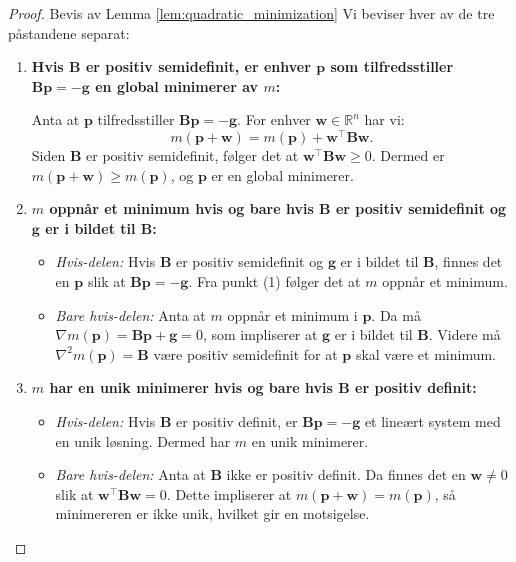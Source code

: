 \begin{proof}{Bevis av Lemma \ref{lem:quadratic_minimization}}
	Vi beviser hver av de tre påstandene separat:

	\begin{enumerate}
		\item \textbf{Hvis \(\symbf{B}\) er positiv semidefinit, er enhver \(\symbf{p}\) som tilfredsstiller \(\symbf{B}\symbf{p} = -\symbf{g}\) en global minimerer av \(m\):}

		      Anta at \(\symbf{p}\) tilfredsstiller \(\symbf{B}\symbf{p} = -\symbf{g}\). For enhver \(\symbf{w} \in \mathbb{R}^n\) har vi:
		      \[
			      m(\symbf{p} + \symbf{w}) = m(\symbf{p}) + \symbf{w}^\top \symbf{B} \symbf{w}.
		      \]
		      Siden \(\symbf{B}\) er positiv semidefinit, følger det at \(\symbf{w}^\top \symbf{B} \symbf{w} \geq 0\). Dermed er \(m(\symbf{p} + \symbf{w}) \geq m(\symbf{p})\), og \(\symbf{p}\) er en global minimerer.

		\item \textbf{\(m\) oppnår et minimum hvis og bare hvis \(\symbf{B}\) er positiv semidefinit og \(\symbf{g}\) er i bildet til \(\symbf{B}\):}

		      \begin{itemize}
			      \item \textit{Hvis-delen:} Hvis \(\symbf{B}\) er positiv semidefinit og \(\symbf{g}\) er i bildet til \(\symbf{B}\), finnes det en \(\symbf{p}\) slik at \(\symbf{B}\symbf{p} = -\symbf{g}\). Fra punkt (1) følger det at \(m\) oppnår et minimum.
			      \item \textit{Bare hvis-delen:} Anta at \(m\) oppnår et minimum i \(\symbf{p}\). Da må \(\nabla m(\symbf{p}) = \symbf{B}\symbf{p} + \symbf{g} = 0\), som impliserer at \(\symbf{g}\) er i bildet til \(\symbf{B}\). Videre må \(\nabla^2 m(\symbf{p}) = \symbf{B}\) være positiv semidefinit for at \(\symbf{p}\) skal være et minimum.
		      \end{itemize}

		\item \textbf{\(m\) har en unik minimerer hvis og bare hvis \(\symbf{B}\) er positiv definit:}

		      \begin{itemize}
			      \item \textit{Hvis-delen:} Hvis \(\symbf{B}\) er positiv definit, er \(\symbf{B}\symbf{p} = -\symbf{g}\) et lineært system med en unik løsning. Dermed har \(m\) en unik minimerer.
			      \item \textit{Bare hvis-delen:} Anta at \(\symbf{B}\) ikke er positiv definit. Da finnes det en \(\symbf{w} \neq 0\) slik at \(\symbf{w}^\top \symbf{B} \symbf{w} = 0\). Dette impliserer at \(m(\symbf{p} + \symbf{w}) = m(\symbf{p})\), så minimereren er ikke unik, hvilket gir en motsigelse.
		      \end{itemize}
	\end{enumerate}
\end{proof}

